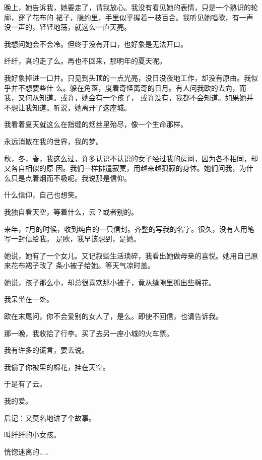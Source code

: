 		晚上，她告诉我，她要走了，请我放心。我没有看见她的表情，只是一个熟识的轮廓，穿了花布的
	裙子，隐约里，手里似乎握着一枝百合。我听见她唱歌，有一声没一声的，轻轻地荡，就这么一直天亮。

		我想问她会不会冷。但终于没有开口，也好象是无法开口。\par
		纤纤，真的走了么。再也不回来，那明年的夏天呢。

		我好象掉进一口井。只见到头顶的一点光亮，没日没夜地工作，却没有原由。我似乎并不想要些什
	么。躲在角落，度着奇怪离奇的日月。有人问我欧的去向，而我，又何从知道。或许，她会有一个孩子，
	或许没有，我都不会知道。如果她并不想让我知道。听说，她离开了这座城。

		我看着夏天就这么在指缝的烟丝里殆尽，像一个生命那样。\par
		永远消散在我的世界，我的梦。

		秋，冬，春，我这么过，许多认识不认识的女子经过我的房间，因为各不相同，却又各自相似的原
	因。我们一样排遣寂寞，用越来越孤寂的身体。她们问我，为什么只是点着烟而不吸呢。我说那是信仰。

		什么信仰，自己也想笑。\par
		我独自看天空，等着什么，云？或者别的。


		来年，7月的时候，收到纯白的一只信封。齐整的写我的名字。很久，没有人用笔写一封信给我。
	是欧，我早该想到，是她。

		她说，她有了一个女儿。又记叙些生活琐碎，我看出她做母亲的喜悦。她用自己原来花布裙子改了
	条小被子给她。等天气凉时盖。

		她说，孩子那么小，却总很喜欢那小被子，竟从缝隙里抓出些棉花。\par
		我呆坐在一处。\par
		欧在末尾问，你不会爱别的女人了，是么。即使不回信，也请告诉我。\par
		那一晚，我收拾了行李。买了去另一座小城的火车票。\par
		我有许多的谎言，要去说。


		我偷了你被里的棉花，挂在天空。\par
		于是有了云。\par
		我的爱。\par
		后记：又莫名地讲了个故事。\par
		叫纤纤的小女孩。\par
		恍惚迷离的……

	\endwriting



